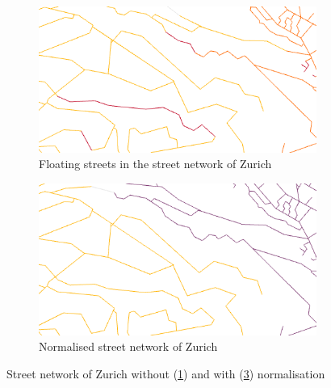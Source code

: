 \documentclass[11pt, a4paper]{report}
\begin{document}
\begin{figure}
    \centering
    \begin{subfigure}[b]{0.8\textwidth}
        \begin{mdframed}[style=mdthight]
            \includegraphics[width=\linewidth]{zuerich_street_error_cropped.png}
        \end{mdframed}
        \caption{Floating streets in the street network of Zurich}
        \label{fig:zuerich_error}
    \end{subfigure}
    \par\medskip
    \begin{subfigure}[b]{0.8\textwidth}
        \begin{mdframed}[style=mdthight]
            \includegraphics[width=\linewidth]{zuerich_street_fixed_cropped.png}
        \end{mdframed}
        \caption{Normalised street network of Zurich}
        \label{fig:zuerich_fixed}
    \end{subfigure}
    \caption{Street network of Zurich without (\ref{fig:zuerich_error}) and with (\ref{fig:zuerich_fixed}) normalisation}
\end{figure}
\end{document}
